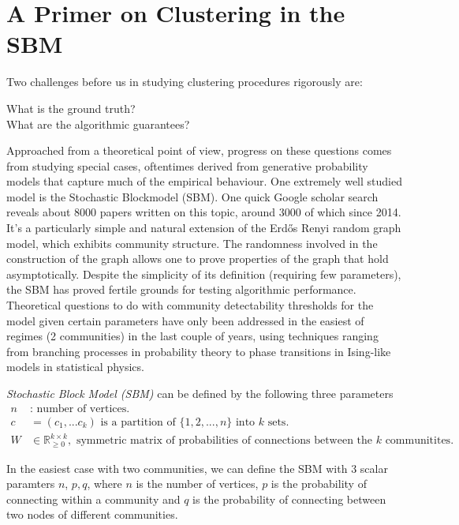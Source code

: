 \chapter{A Primer on Clustering in the SBM}

Two challenges before us in studying clustering procedures rigorously are: 
\begin{center}
What is the ground truth?\\

What are the algorithmic guarantees?
\end{center}
Approached from a theoretical point of view, progress on these questions comes from studying special cases, oftentimes derived from generative probability models that capture much of the empirical behaviour.  One extremely well studied model is the Stochastic Blockmodel (SBM).  One quick Google scholar search reveals about 8000 papers written on this topic, around 3000 of which since 2014.  It's a particularly simple and natural extension of the Erd\H{o}s Renyi random graph model, which exhibits community structure.  The randomness involved in the construction of the graph allows one to prove properties of the graph that hold asymptotically.  Despite the simplicity of its definition (requiring few parameters), the SBM has proved fertile grounds for testing algorithmic performance.  Theoretical questions to do with community detectability thresholds for the model given certain parameters have only been addressed in the easiest of regimes (2 communities)  in the last couple of years, using techniques ranging from branching processes in probability theory to phase transitions in Ising-like models in statistical physics.  

\begin{definition}\textit{Stochastic Block Model (SBM)}
can be defined by the following three parameters
\begin{align*}
    n & : \text{ number of vertices. }\\
    c & =(c_1, ...c_k) \text{ is a partition of } \{1,2, ...,n\} \text{ into } k \text{ sets. }\\
    W & \in \mathbb{R}^{k \times k}_{\geq 0}, \text{ symmetric matrix of probabilities of connections between the } k \text{ communitites.}
\end{align*}

In the easiest case with two communities, we can define the SBM with 3 scalar paramters $n$, $p, q$, where $n$ is the number of vertices, $p$ is the probability of connecting within a community and $q$ is the probability of connecting between two nodes of different communities. 

\end{definition}



